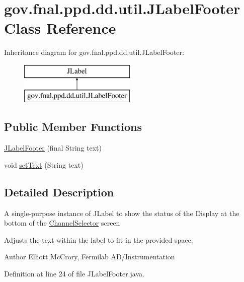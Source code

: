 \hypertarget{classgov_1_1fnal_1_1ppd_1_1dd_1_1util_1_1JLabelFooter}{\section{gov.\-fnal.\-ppd.\-dd.\-util.\-J\-Label\-Footer Class Reference}
\label{classgov_1_1fnal_1_1ppd_1_1dd_1_1util_1_1JLabelFooter}
}
Inheritance diagram for gov.\-fnal.\-ppd.\-dd.\-util.\-J\-Label\-Footer\-:\begin{figure}[H]
\begin{center}
\leavevmode
\includegraphics[height=2.000000cm]{classgov_1_1fnal_1_1ppd_1_1dd_1_1util_1_1JLabelFooter}
\end{center}
\end{figure}
\subsection*{Public Member Functions}
\begin{DoxyCompactItemize}
\item 
\hyperlink{classgov_1_1fnal_1_1ppd_1_1dd_1_1util_1_1JLabelFooter_ab4537cd908aa02ec862e7bc068803aef}{J\-Label\-Footer} (final String text)
\item 
void \hyperlink{classgov_1_1fnal_1_1ppd_1_1dd_1_1util_1_1JLabelFooter_ab7c60651bcbb172b880fcdc0bf0107b8}{set\-Text} (String text)
\end{DoxyCompactItemize}


\subsection{Detailed Description}
A single-\/purpose instance of J\-Label to show the status of the Display at the bottom of the \hyperlink{classgov_1_1fnal_1_1ppd_1_1dd_1_1ChannelSelector}{Channel\-Selector} screen

Adjusts the text within the label to fit in the provided space.

\begin{DoxyAuthor}{Author}
Elliott Mc\-Crory, Fermilab A\-D/\-Instrumentation 
\end{DoxyAuthor}


Definition at line 24 of file J\-Label\-Footer.\-java.



